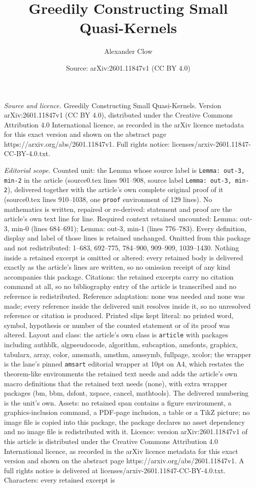 \documentclass[10pt,a4paper]{amsart}
\title[Greedily Constructing Small Quasi-Kernels]{Greedily Constructing Small Quasi-Kernels}
\author{Alexander Clow}
\date{Source: arXiv:2601.11847v1 (CC BY 4.0)}
\begin{document}
\maketitle

\noindent\emph{Source and licence.} Greedily Constructing Small Quasi-Kernels. Version arXiv:2601.11847v1 (CC BY 4.0), distributed under the Creative Commons Attribution 4.0 International licence, as recorded in the arXiv licence metadata for this exact version and shown on the abstract page https://arxiv.org/abs/2601.11847v1. Full rights notice: licenses/arxiv-2601.11847-CC-BY-4.0.txt.\par\smallskip

\noindent\textit{Editorial scope.} Counted unit: the Lemma whose source label is \texttt{Lemma: out-3, min-2} in the article (source0.tex lines 901--908, source label \texttt{Lemma: out-3, min-2}), delivered together with the article's own complete original proof of it (source0.tex lines 910--1038, one \texttt{proof} environment of 129 lines). No mathematics is written, repaired or re-derived: statement and proof are the article's own text line for line. Required context retained uncounted: Lemma: out-3, min-0 (lines 684--691); Lemma: out-3, min-1 (lines 776--783). Every definition, display and label of those lines is retained unchanged. Omitted from this package and not redistributed: 1--683, 692--775, 784--900, 909--909, 1039--1430. Nothing inside a retained excerpt is omitted or altered: every retained body is delivered exactly as the article's lines are written, so no omission receipt of any kind accompanies this package. Citations: the retained excerpts carry no citation command at all, so no bibliography entry of the article is transcribed and no reference is redistributed. Reference adaptation: none was needed and none was made; every reference inside the delivered unit resolves inside it, so no unresolved reference or citation is produced. Printed slips kept literal: no printed word, symbol, hypothesis or number of the counted statement or of its proof was altered. Layout and class: the article's own class is \texttt{article} with packages including authblk, algpseudocode, algorithm, subcaption, amsfonts, graphicx, tabularx, array, color, amsmath, amsthm, amssymb, fullpage, xcolor; the wrapper is the lane's pinned \texttt{amsart} editorial wrapper at 10pt on A4, which restates the theorem-like environments the retained text needs and adds the article's own macro definitions that the retained text needs (none), with extra wrapper packages (bm, bbm, dsfont, xspace, cancel, mathtools). The delivered numbering is the unit's own. Assets: no retained span contains a figure environment, a graphics-inclusion command, a PDF-page inclusion, a table or a TikZ picture; no image file is copied into this package, the package declares no asset dependency and no image file is redistributed with it. Licence: version arXiv:2601.11847v1 of this article is distributed under the Creative Commons Attribution 4.0 International licence, as recorded in the arXiv licence metadata for this exact version and shown on the abstract page https://arxiv.org/abs/2601.11847v1. A full rights notice is delivered at licenses/arxiv-2601.11847-CC-BY-4.0.txt. Characters: every retained excerpt is 
\end{document}

